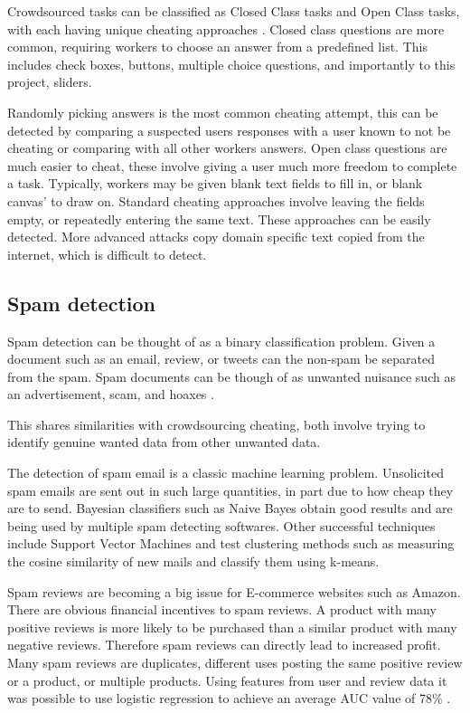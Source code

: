 \documentclass{article}
\begin{document}
Crowdsourced tasks can be classified as Closed Class tasks and Open Class tasks, with each having unique cheating approaches \cite{eickhoff2013increasing}.
Closed class questions are more common, requiring workers to choose an answer from a predefined list.
This includes check boxes, buttons, multiple choice questions, and importantly to this project, sliders.

Randomly picking answers is the most common cheating attempt, this can be detected by comparing a suspected users responses with a user known to not be cheating or comparing with all other workers answers.
Open class questions are much easier to cheat, these involve giving a user much more freedom to complete a task.
Typically, workers may be given blank text fields to fill in, or blank canvas' to draw on.
Standard cheating approaches involve leaving the fields empty, or repeatedly entering the same text.
These approaches can be easily detected.
More advanced attacks copy domain specific text copied from the internet, which is difficult to detect. 

\subsection{Spam detection}

Spam detection can be thought of as a binary classification problem.
Given a document such as an email, review, or tweets can the non-spam be separated from the spam.
Spam documents can be though of as unwanted nuisance such as an advertisement, scam, and hoaxes \cite{sasaki2005spam}.
 
This shares similarities with crowdsourcing cheating, both involve trying to identify genuine wanted data from other unwanted data.

The detection of spam email is a classic machine learning problem.
Unsolicited spam emails are sent out in such large quantities, in part due to how cheap they are to send.
Bayesian classifiers such as Naive Bayes obtain good results and are being used by multiple spam detecting softwares.
Other successful techniques include Support Vector Machines and test clustering methods such as measuring the cosine similarity of new mails and classify them using k-means.  
\cite{sasaki2005spam}

Spam reviews are becoming a big issue for E-commerce websites such as Amazon.
There are obvious financial incentives to spam reviews.
A product with many positive reviews is more likely to be purchased than a similar product with many negative reviews.
Therefore spam reviews can directly lead to increased profit.
Many spam reviews are duplicates, different uses posting the same positive review or a product, or multiple products.
Using features from user and review data it was possible to use logistic regression to achieve an average AUC value of 78\% \cite{jindal2007review}.
\end{document}
